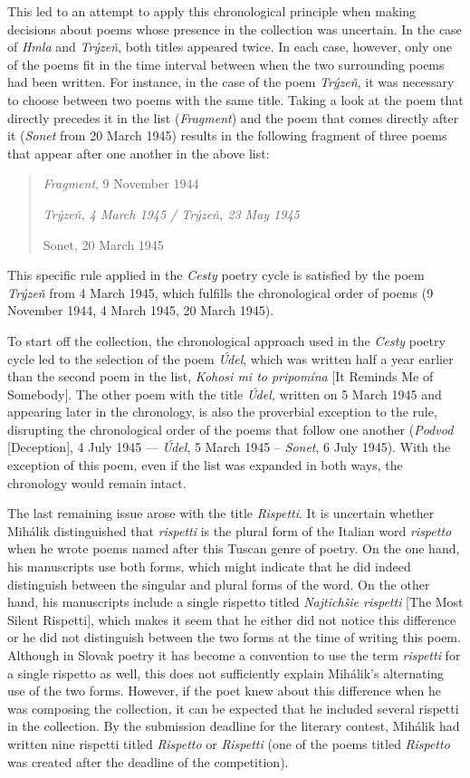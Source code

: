 \documentclass{article}
\begin{document}
This led to an attempt to apply this chronological principle when making
decisions about poems whose presence in the collection was uncertain. In
the case of \emph{Hmla} and \emph{Trýzeň}, both titles appeared twice.
In each case, however, only one of the poems fit in the time interval
between when the two surrounding poems had been written. For instance,
in the case of the poem \emph{Trýzeň}, it was necessary to choose
between two poems with the same title. Taking a look at the poem that
directly precedes it in the list (\emph{Fragment}) and the poem that
comes directly after it (\emph{Sonet} from 20 March 1945) results in the
following fragment of three poems that appear after one another in the above
list:
\begin{quote}
\emph{Fragment}, 9 November 1944

\emph{Trýzeň, 4 March 1945 / Trýzeň, 23 May 1945}

Sonet, 20 March 1945
\end{quote}
This specific rule applied in the \emph{Cesty} poetry cycle is satisfied
by the poem \emph{Trýzeň} from 4 March 1945, which fulfills the
chronological order of poems (9 November 1944, 4 March 1945, 20 March
1945).

To start off the collection, the chronological approach used in the
\emph{Cesty} poetry cycle led to the selection of the poem \emph{Údel},
which was written half a year earlier than the second poem in the list,
\emph{Kohosi mi to pripomína} [It Reminds Me of Somebody]. The other
poem with the title \emph{Údel,} written on 5 March 1945 and appearing
later in the chronology, is also the proverbial exception to the rule,
disrupting the chronological order of the poems that follow one another
(\emph{Podvod} [Deception], 4 July 1945 –– \emph{Údel}, 5 March 1945 --
\emph{Sonet}, 6 July 1945). With the exception of this poem\emph{,} even
if the list was expanded in both ways, the chronology would remain
intact.

The last remaining issue arose with the title \emph{Rispetti}. It is
uncertain whether Mihálik distinguished that \emph{rispetti} is the
plural form of the Italian word \emph{rispetto} when he wrote poems
named after this Tuscan genre of poetry. On the one hand, his
manuscripts use both forms, which might indicate that he did indeed
distinguish between the singular and plural forms of the word. On the
other hand, his manuscripts include a single rispetto titled
\emph{Najtichšie rispetti} [The Most Silent Rispetti], which makes it
seem that he either did not notice this difference or he did not
distinguish between the two forms at the time of writing this poem.
Although in Slovak poetry it has become a convention to use the term
\emph{rispetti} for a single rispetto as well, this does not
sufficiently explain Mihálik's alternating use of the two forms.
However, if the poet knew about this difference when he was composing
the collection\emph{,} it can be expected that he included several
rispetti in the collection. By the submission deadline for the literary
contest, Mihálik had written nine rispetti titled \emph{Rispetto} or
\emph{Rispetti} (one of the poems titled \emph{Rispetto} was created
after the deadline of the competition).
\end{document}
